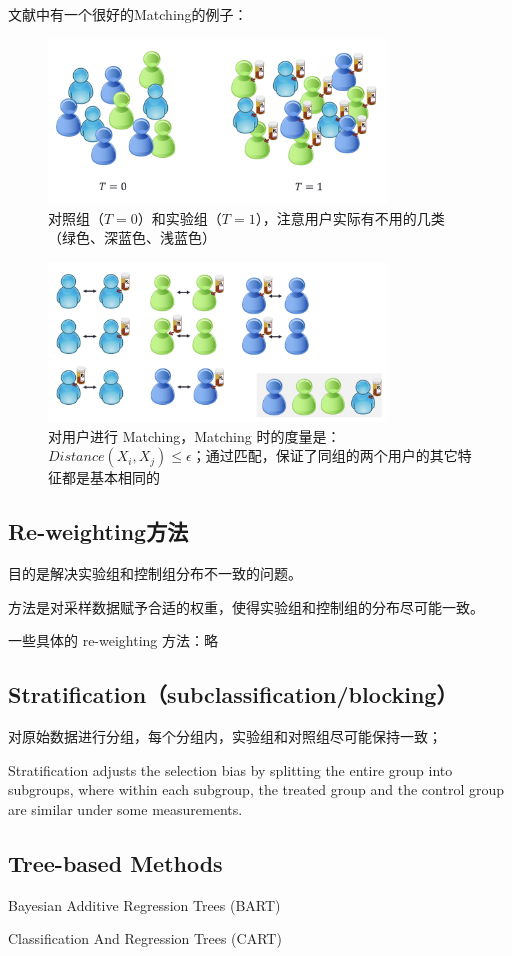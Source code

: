 \documentclass[12pt]{article}
\begin{document}
文献\cite{Causal_Inference_and_Stable_Learning}中有一个很好的Matching的例子：
\begin{figure}[H]
    \centering
    \caption*{对照组（$T=0$）和实验组（$T=1$），注意用户实际有不用的几类（绿色、深蓝色、浅蓝色）}
    \includegraphics[width=0.8\textwidth]{fig/Causal_Inference_and_Stable_Learning-Matching-1.png}
\end{figure}

\begin{figure}[H]
    \centering
    \caption*{对用户进行 Matching，Matching 时的度量是：$Distance(X_i, X_j) \le \epsilon$；通过匹配，保证了同组的两个用户的其它特征都是基本相同的}
    \includegraphics[width=0.8\textwidth]{fig/Causal_Inference_and_Stable_Learning-Matching-2.png}
\end{figure}

\subsection{Re-weighting方法}
目的是解决实验组和控制组分布不一致的问题。

方法是对采样数据赋予合适的权重，使得实验组和控制组的分布尽可能一致。

一些具体的 re-weighting 方法：略\cite{AAAI_2020_Tutorial_Representation_Learning_for_Causal_Inference}

\subsection{Stratiﬁcation（subclassiﬁcation/blocking）}
对原始数据进行分组，每个分组内，实验组和对照组尽可能保持一致；

Stratiﬁcation adjusts the selection bias by splitting the entire group into subgroups, where within each subgroup, the treated group and the control group are similar under some measurements.

\subsection{Tree-based Methods}
Bayesian Additive Regression Trees (BART)

Classiﬁcation And Regression Trees (CART)




\end{document}
